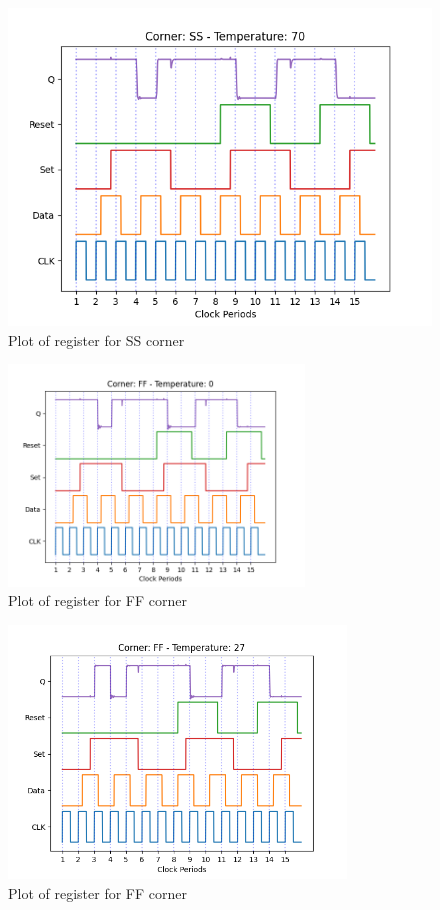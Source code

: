 \begin{figure}[H]
    \centering
    \includegraphics[width=\textwidth]{Figures/Aimspice_Plots/SS_70.png}
    \caption{Plot of register for SS corner}
    \label{fig:SS70}
\end{figure}

\begin{figure}[H]
    \centering
    \includegraphics[width=0.7\textwidth]{Figures/Aimspice_Plots/FF_0.png}
    \caption{Plot of register for FF corner}
    \label{fig:FF0}
\end{figure}

\begin{figure}[H]
    \centering
    \includegraphics[width=0.8\textwidth]{Figures/Aimspice_Plots/FF_27.png}
    \caption{Plot of register for FF corner}
    \label{fig:FF27}
\end{figure}

